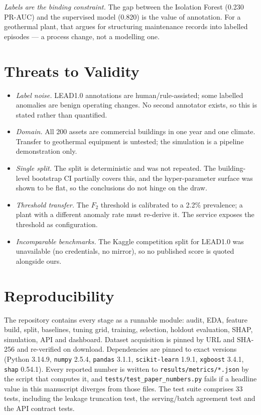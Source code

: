 \documentclass[conference]{IEEEtran}
\begin{document}
\emph{Labels are the binding constraint.} The gap between the Isolation Forest (0.230 PR-AUC) and the
supervised model (0.820) is the value of annotation. For a geothermal plant, that argues for
structuring maintenance records into labelled episodes --- a process change, not a modelling one.

\section{Threats to Validity}

\begin{itemize}
\item \emph{Label noise.} LEAD1.0 annotations are human/rule-assisted; some labelled anomalies are
benign operating changes. No second annotator exists, so this is stated rather than quantified.
\item \emph{Domain.} All 200 assets are commercial buildings in one year and one climate. Transfer to
geothermal equipment is untested; the simulation is a pipeline demonstration only.
\item \emph{Single split.} The split is deterministic and was not repeated. The building-level
bootstrap CI partially covers this, and the hyper-parameter surface was shown to be flat, so the
conclusions do not hinge on the draw.
\item \emph{Threshold transfer.} The $F_2$ threshold is calibrated to a 2.2\% prevalence; a plant with
a different anomaly rate must re-derive it. The service exposes the threshold as configuration.
\item \emph{Incomparable benchmarks.} The Kaggle competition split for LEAD1.0 was unavailable (no
credentials, no mirror), so no published score is quoted alongside ours.
\end{itemize}

\section{Reproducibility}

The repository contains every stage as a runnable module: audit, EDA, feature build, split,
baselines, tuning grid, training, selection, holdout evaluation, SHAP, simulation, API and dashboard.
Dataset acquisition is pinned by URL and SHA-256 and re-verified on download. Dependencies are pinned
to exact versions (Python 3.14.9, \texttt{numpy} 2.5.4, \texttt{pandas} 3.1.1, \texttt{scikit-learn}
1.9.1, \texttt{xgboost} 3.4.1, \texttt{shap} 0.54.1). Every reported number is written to
\texttt{results/metrics/*.json} by the script that computes it, and
\texttt{tests/test\_paper\_numbers.py} fails if a headline value in this manuscript diverges from
those files. The test suite comprises 33 tests, including the leakage truncation test, the
serving/batch agreement test and the API contract tests.
\end{document}
